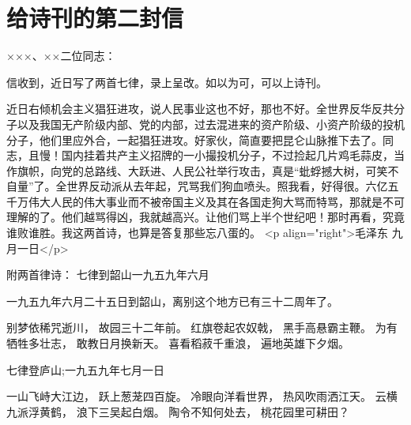 \section[给诗刊的第二封信（一九五九年九月一日）]{给诗刊的第二封信}


×××、××二位同志：

信收到，近日写了两首七律，录上呈改。如以为可，可以上诗刊。

近日右倾机会主义猖狂进攻，说人民事业这也不好，那也不好。全世界反华反共分子以及我国无产阶级内部、党的内部，过去混进来的资产阶级、小资产阶级的投机分子，他们里应外合，一起猖狂进攻。好家伙，简直要把昆仑山脉推下去了。同志，且慢！国内挂着共产主义招牌的一小撮投机分子，不过捡起几片鸡毛蒜皮，当作旗帜，向党的总路线、大跃进、人民公社举行攻击，真是“蚍蜉撼大树，可笑不自量”了。全世界反动派从去年起，咒骂我们狗血喷头。照我看，好得很。六亿五千万伟大人民的伟大事业而不被帝国主义及其在各国走狗大骂而特骂，那就是不可理解的了。他们越骂得凶，我就越高兴。让他们骂上半个世纪吧！那时再看，究竟谁败谁胜。我这两首诗，也算是答复那些忘八蛋的。
<p align="right">毛泽东
九月一日</p>

附两首律诗：
七律到韶山一九五九年六月

一九五九年六月二十五日到韶山，离别这个地方已有三十二周年了。

别梦依稀咒逝川，
故园三十二年前。
红旗卷起农奴戟，
黑手高悬霸主鞭。
为有牺牲多壮志，
敢教日月换新天。
喜看稻菽千重浪，
遍地英雄下夕烟。


七律登庐山;一九五九年七月一日

一山飞峙大江边，
跃上葱茏四百旋。
冷眼向洋看世界，
热风吹雨洒江天。
云横九派浮黄鹤，
浪下三吴起白烟。
陶令不知何处去，
桃花园里可耕田？


